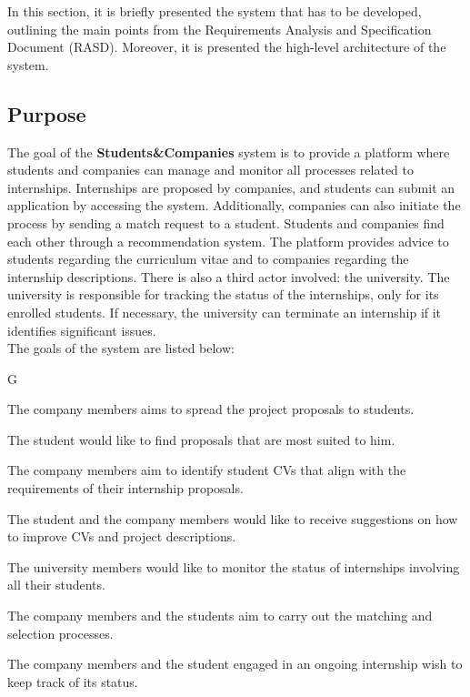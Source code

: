 In this section, it is briefly presented the system that has to be developed, outlining the main points from the Requirements Analysis and Specification Document (RASD). Moreover, it is presented the high-level architecture of the system.
\subsection{Purpose}
The goal of the \textbf{Students\&Companies} system is to provide a platform 
where students and companies can manage and monitor all processes related to 
internships. Internships are proposed by companies, and students can submit an 
application by accessing the system. Additionally, companies can also initiate 
the process by sending a match request to a student. Students and companies find each other through a recommendation system.
The platform provides advice to students regarding the curriculum vitae and to companies regarding the
internship descriptions. There is also a third actor involved: the university. 
The university is responsible for tracking the status of the internships, only for its enrolled students. 
If necessary, the university can terminate an internship if it identifies significant issues.\\

\noindent
The goals of the system are listed below:
\begin{listInSquareBrackets}{G}
    \item The company members aims to spread the project proposals to students.
    \item The student would like to find proposals that are most suited to him.
    \item The company members aim to identify student CVs that align with the requirements of their internship proposals.
    \item The student and the company members would like to receive suggestions on how to improve CVs and project descriptions.
    \item The university members would like to monitor the status of internships involving all their students.
    \item The company members and the students aim to carry out the matching and selection processes.
    \item The company members and the student engaged in an ongoing internship wish to keep track of its status.
\end{listInSquareBrackets}


